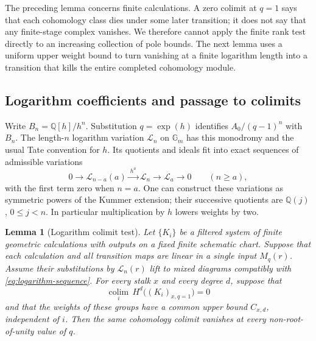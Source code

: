 \documentclass[11pt]{article}
\numberwithin{equation}{section}
\newtheorem{lemma}[theorem]{Lemma}
\theoremstyle{definition}
\theoremstyle{remark}
\begin{document}
The preceding lemma concerns finite calculations.  A zero colimit at
$q=1$ says that each cohomology class dies under some later transition;
it does not say that any finite-stage complex vanishes.  We therefore
cannot apply the finite rank test directly to an increasing collection
of pole bounds.  The next lemma uses a uniform upper weight bound to
turn vanishing at a finite logarithm length into a transition that
kills the entire completed cohomology module.

\subsection{Logarithm coefficients and passage to colimits}

Write $B_n=\mathbb Q[h]/h^n$.  Substitution $q=\exp(h)$ identifies
$A_0/(q-1)^n$ with $B_n$.  The length-$n$ logarithm variation
$\mathcal L_n$ on $\mathbb G_m$ has this monodromy and the usual
Tate convention for $h$.  Its quotients and ideals fit into exact
sequences of admissible variations
\begin{equation}\label{eq:logarithm-sequence}
 0\longrightarrow\mathcal L_{n-a}(a)
  \xrightarrow{\ h^a\ }\mathcal L_n
  \longrightarrow\mathcal L_a\longrightarrow0
                         \qquad(n\ge a),
\end{equation}
with the first term zero when $n=a$.  One can construct these
variations as symmetric powers of the Kummer extension; their
successive quotients are $\mathbb Q(j)$, $0\le j<n$.
In particular multiplication by $h$ lowers weights by two.

\begin{lemma}[Logarithm colimit test]\label{deform:colimit}
Let $\{K_i\}$ be a filtered system of finite geometric calculations
with outputs on a fixed finite schematic chart.  Suppose that each
calculation and all transition maps are linear in a single input
$M_q(r)$.  Assume their substitutions by $\mathcal L_n(r)$ lift to
mixed diagrams compatibly with \eqref{eq:logarithm-sequence}.
For every stalk $x$ and every degree $d$, suppose that
\[
 \underset{i}{\operatorname{colim}}\,
 H^d\bigl((K_i)_{x,q=1}\bigr)=0
\]
and that the weights of these groups have a common upper bound
$C_{x,d}$, independent of $i$.  Then the same cohomology colimit
vanishes at every non-root-of-unity value of $q$.
\end{lemma}
\end{document}

